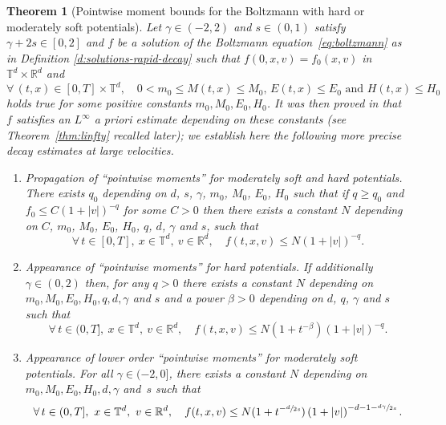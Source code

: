 \documentclass[JEP,XML,SOM,Unicode,NoFloatCountersInSection]{cedram}
\theoremstyle{plain}
\newtheorem{thm}{Theorem}[section]
\theoremstyle{definition}
\numberwithin{equation}{section}
\newcommand{\R}{\mathbb R}
\let\A N
\begin{document}
\begin{thm}[Pointwise moment bounds for the Boltzmann with hard or
moderately soft potentials]\label{thm:upper}
Let $\gamma \in (-2,2)$ and $s \in (0,1)$ satisfy
$\gamma +2s \in [0,2]$ and $f$ be a solution of the Boltzmann
equation~\eqref{eq:boltzmann} as in Definition
\ref{d:solutions-rapid-decay} such that $f(0,x,v)=f_0(x,v)$ in $\mathbb{T}^d \times \R^d$ and
\begin{equation}\label{eq:non-deg}
\forall \, (t,x) \in [0,T] \times \mathbb T^d, \quad 0\!<\!m_0\!\le\! M(t,x)\!\le\! M_0, \,
E(t,x)\!\le\! E_0 \text{ and } H(t,x)\!\le\! H_0
\end{equation}
holds true for some positive constants $m_0,M_0,E_0,H_0$. It was then
proved in \cite{luis} that~$f$ satisfies an $L^\infty$ a priori
estimate depending on these constants (see Theorem~\ref{thm:linfty}
recalled later); we establish here the following more precise decay
estimates at large velocities.
\begin{enumerate}
\item \label{i:3} \emph{Propagation of ``pointwise moments'' for
moderately soft and hard potentials.} There exists $q_0$ depending
on $d$, $s$, $\gamma$, $m_0$, $M_0$, $E_0$, $H_0$ such that if
$q \ge q_0$ and $f_0 \le C (1 + |v|)^{-q}$ for some $C>0$ then
there exists a constant $\A$ depending on $C$, $m_0$, $M_0$, $E_0$,
$H_0$, $q$, $d$, $\gamma$ and $s$, such that
\[
\forall \, t \in [0,T], \ x \in \mathbb{T}^d, \ v \in \R^d, \quad
f (t,x,v) \le \A \left(1+|v|\right)^{-q}.
\]

\item \label{i:2} \emph{Appearance of ``pointwise moments'' for hard
potentials.} If additionally $\gamma \in (0,2)$ then, for any
$q>0$ there exists a constant $\A$ depending on
$m_0,M_0,E_0, H_0, q, d, \gamma$ and $s$ and a power $\beta>0$
depending on $d$, $q$, $\gamma$ and $s$ such that
\[
\forall \, t \in (0,T], \ x \in \mathbb{T}^d, \ v \in \R^d, \quad
f(t,x,v) \le \A\left(1+t^{-\beta}\right) \left(1 + |v|\right)^{-q}.
\]

\item \label{i:1} \emph{Appearance of lower order ``pointwise
moments'' for moderately soft potentials.} For all
$\gamma \in (-2,0]$, there exists a constant $\A$ depending on
$m_0,M_0,E_0, H_0, d, \gamma$ and~$s$ such that
\[
\forall \, t \in (0,T], \ x \in \mathbb{T}^d, \ v \in \R^d, \quad
f(t,x,v) \le \A(1+t^{-\sfrac{d}{2s}}) \left( 1 +
|v|\right)^{-d-1-\sfrac{d \gamma}{2s}}.
\]
\end{enumerate}
\end{thm}
\end{document}
